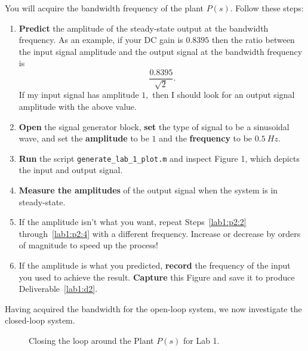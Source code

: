 \begin{procedure}[label={proc:lab1:p2}]
  You will acquire the bandwidth frequency of the plant \(P(s)\).
  Follow these steps:
  \begin{enumerate}[label=(\arabic*)]
    \item{
      \textbf{Predict} the amplitude of the steady-state output at the
      bandwidth frequency. As an example, if your DC gain is \(0.8395\) then
      the ratio between the input signal amplitude and the output signal
      at the bandwidth frequency is
      \[
        \frac{0.8395}{\sqrt{2}}.
      \]
      If my input signal has amplitude \(1,\) then I should look for
      an output signal amplitude with the above value.
    }
    \item{
      \label{lab1:p2:2}
      \textbf{Open} the signal generator block, \textbf{set} the type of signal
      to be a sinusoidal wave, and set the
      \textbf{amplitude} to be \(1\) and
      the \textbf{frequency} to be \(\SI{0.5}{Hz}.\)
    }
    \item{
      \textbf{Run} the script \texttt{generate\_lab\_1\_plot.m} and inspect
      Figure 1, which depicts the input and output signal.
    }
    \item{
      \label{lab1:p2:4}
      \textbf{Measure the amplitudes} of the output signal
      when the system is in steady-state.
    }
    \item{
      If the amplitude isn't what you want, repeat Steps~\ref{lab1:p2:2} through~\ref{lab1:p2:4} with a different frequency. Increase or decrease
      by orders of magnitude to speed up the process!
    }
    \item{
      If the amplitude is what you predicted, \textbf{record} the frequency
      of the input you used to achieve the result.
      \textbf{Capture} this Figure and save it to produce Deliverable~\ref{lab1:d2}.
    }
  \end{enumerate}
\end{procedure}
%
Having acquired the bandwidth for the open-loop system, we now investigate
the closed-loop system.
%
\begin{figure}
  \centering
  \caption[Closed-Loop Diagram for Lab 1]{
    Closing the loop around the Plant \(P(s)\) for Lab 1.
  }
  \label{fig:lab1:closing-loop}
\end{figure}
